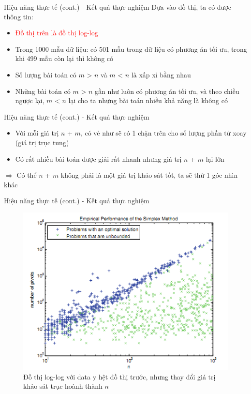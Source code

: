 \documentclass[10pt]{beamer}
\begin{document}
\begin{frame}[fragile]{Hiệu năng thực tế (cont.) - Kết quả thực nghiệm}
Dựa vào đồ thị, ta có được thông tin:
\begin{itemize}
\item \textcolor{red}{Đồ thị trên là đồ thị log-log}
\item Trong 1000 mẫu dữ liệu: có 501 mẫu trong dữ liệu có phương án tối ưu, trong khi 499 mẫu còn lại thì không có
\item Số lượng bài toán có $m$ > $n$ và $m$ < $n$ là xấp xỉ bằng nhau
\item Những bài toán có $m$ > $n$ gần như luôn có phương án tối ưu, và theo chiều ngược lại, $m$ < $n$ lại cho ta những bài toán nhiều khả năng là không có
\end{itemize}
\end{frame}

\begin{frame}[fragile]{Hiệu năng thực tế (cont.) - Kết quả thực nghiệm}
\begin{itemize}
\item Với mỗi giá trị $n$ + $m$, có vẻ như sẽ có 1 chặn trên cho số lượng phần tử xoay (giá trị trục tung)
\item Có rất nhiều bài toán được giải rất nhanh nhưng giá trị $n$ + $m$ lại lớn
\end{itemize}
$\Rightarrow$ Có thể $n$ + $m$ không phải là một giá trị khảo sát tốt, ta sẽ thử 1 góc nhìn khác
\end{frame}

\begin{frame}[fragile]{Hiệu năng thực tế (cont.) - Kết quả thực nghiệm}
\begin{figure}
\includegraphics[scale=.5]{img/plot_2.png}
\caption{Đồ thị log-log với data y hệt đồ thị trước, nhưng thay đổi giá trị khảo sát trục hoành thành $n$}
\end{figure}
\end{frame}
\end{document}

